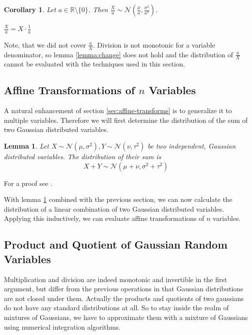\documentclass[11pt,a4paper]{book}
\newtheorem{lemma}{Lemma}
\newtheorem*{corollary}{Corollary}
\begin{document}
\begin{corollary}
  Let $a \in \mathbb{R} \setminus \{ 0 \}$. Then
  $\frac{X}{a} \sim \mathcal{N}\left( \frac{\mu}{a}, \frac{\sigma^{2}}{a^{2}}
  \right)$.
\end{corollary}
\begin{proof2}
  $\frac{X}{a} = X \cdot \frac{1}{a}$
\end{proof2}

Note, that we did not cover $\frac{a}{X}$. Division is not monotonic for a
variable denominator, so lemma \ref{lemma:change} does not hold and the
distribution of $\frac{a}{X}$ cannot be evaluated with the techniques used in
this section.

\subsection{Affine Transformations of $n$ Variables}

A natural enhancement of section \ref{sec:affine-transforms} is to generalize it
to multiple variables. Therefore we will first determine the distribution of the
sum of two Gaussian distributed variables.

\begin{lemma}
  \label{lemma:gaussian-sum}
  Let $X \sim \mathcal{N}(\mu, \sigma^{2}), Y \sim \mathcal{N}(\nu, \tau^{2})$
  be two independent, Gaussian distributed variables. The distribution of their
  sum is
  \begin{equation*}
    X + Y \sim \mathcal{N}(\mu + \nu, \sigma^{2} + \tau^{2})
  \end{equation*}
\end{lemma}
\begin{proof2}
  For a proof see \cite[Satz~11.9]{krengel}.
\end{proof2}

With lemma \ref{lemma:gaussian-sum} combined with the previous section, we can
now calculate the distribution of a linear combination of two Gaussian
distributed variables. Applying this inductively, we can evaluate affine
transformations of $n$ variables.

\subsection{Product and Quotient of Gaussian Random Variables}

Multiplication and division are indeed monotonic and invertible in the first
argument, but differ from the previous operations in that Gaussian distributions
are not closed under them. Actually the products and quotients of two gaussians
do not have any standard distributions at all. So to stay inside the realm of
mixtures of Gaussians, we have to approximate them with a mixture of Gaussians
using numerical integration algorithms.
\end{document}
